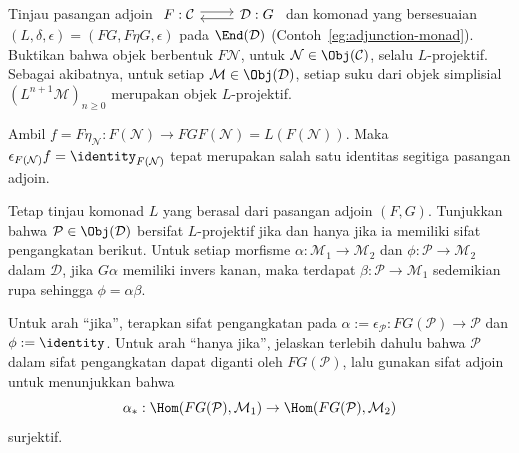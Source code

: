 	\item Tinjau pasangan adjoin
	$\begin{tikzcd}
		F: \mathcal{C} \arrow[shift left, r] & \mathcal{D}: G \arrow[shift left, l]
	\end{tikzcd}$
	dan komonad yang bersesuaian
	$(L,\delta,\epsilon)=(FG,F\eta G,\epsilon)$ pada
	$\End(\mathcal{D})$ (Contoh~\ref{eg:adjunction-monad}). Buktikan bahwa
	objek berbentuk $F\mathcal{N}$, untuk
	$\mathcal{N}\in\Obj(\mathcal{C})$, selalu $L$-projektif. Sebagai
	akibatnya, untuk setiap $\mathcal{M}\in\Obj(\mathcal{D})$, setiap suku
	dari objek simplisial $(L^{n+1}\mathcal{M})_{n\geq0}$ merupakan objek
	$L$-projektif.

	\begin{hint}
		Ambil
		$f=F\eta_{\mathcal{N}}:F(\mathcal{N})\to FGF(\mathcal{N})
		=L(F(\mathcal{N}))$. Maka
		$\epsilon_{F(\mathcal{N})}f=\identity_{F(\mathcal{N})}$ tepat
		merupakan salah satu identitas segitiga pasangan adjoin.
	\end{hint}

	\item Tetap tinjau komonad $L$ yang berasal dari pasangan adjoin
	$(F,G)$. Tunjukkan bahwa $\mathcal{P}\in\Obj(\mathcal{D})$ bersifat
	$L$-projektif jika dan hanya jika ia memiliki sifat pengangkatan
	berikut. Untuk setiap morfisme
	$\alpha:\mathcal{M}_1\to\mathcal{M}_2$ dan
	$\phi:\mathcal{P}\to\mathcal{M}_2$ dalam $\mathcal{D}$, jika
	$G\alpha$ memiliki invers kanan, maka terdapat
	$\beta:\mathcal{P}\to\mathcal{M}_1$ sedemikian rupa sehingga
	$\phi=\alpha\beta$.

	\begin{hint}
		Untuk arah ``jika'', terapkan sifat pengangkatan pada
		$\alpha:=\epsilon_{\mathcal{P}}:FG(\mathcal{P})\to\mathcal{P}$ dan
		$\phi:=\identity$. Untuk arah ``hanya jika'', jelaskan terlebih dahulu
		bahwa $\mathcal{P}$ dalam sifat pengangkatan dapat diganti oleh
		$FG(\mathcal{P})$, lalu gunakan sifat adjoin untuk menunjukkan bahwa
		\[ \alpha_*:\Hom(FG(\mathcal{P}),\mathcal{M}_1)\to
		\Hom(FG(\mathcal{P}),\mathcal{M}_2) \]
		surjektif.
	\end{hint}

